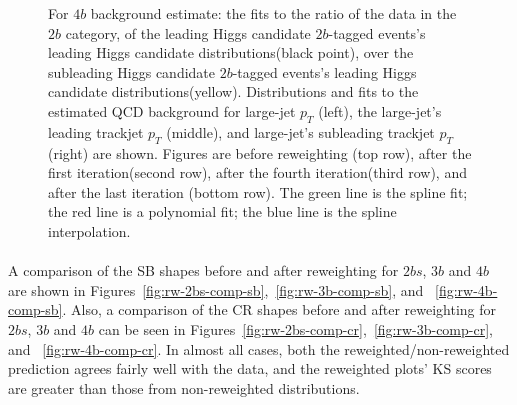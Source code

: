 \begin{figure}[htbp!]
\begin{center}
\caption{For $4b$ background estimate: the fits to the ratio of the data in the $2b$ category, of the leading Higgs candidate $2b$-tagged events's leading Higgs candidate distributions(black point), over the subleading Higgs candidate $2b$-tagged events's leading Higgs candidate distributions(yellow). Distributions and fits to the estimated QCD background for large-\R jet $p_{T}$ (left),  the large-\R jet's leading trackjet $p_T$ (middle), and large-\R jet's subleading trackjet $p_T$ (right) are shown.  Figures are before reweighting (top row), after the first iteration(second row), after the fourth iteration(third row), and after the last iteration (bottom row). The green line is the spline fit; the red line is a polynomial fit; the blue line is the spline interpolation.}
\label{fig:rw-4b-subl}
\end{center}
\end{figure}


\paragraph{}
A comparison of the SB shapes before and after reweighting for $2bs$, $3b$ and $4b$ are shown in Figures~\ref{fig:rw-2bs-comp-sb},~\ref{fig:rw-3b-comp-sb}, and ~\ref{fig:rw-4b-comp-sb}. 
Also, a comparison of the CR shapes before and after reweighting for $2bs$, $3b$ and $4b$ can be seen in Figures~\ref{fig:rw-2bs-comp-cr},~\ref{fig:rw-3b-comp-cr}, and ~\ref{fig:rw-4b-comp-cr}. 
In almost all cases, both the reweighted/non-reweighted prediction agrees fairly well with the data, and the reweighted plots' KS scores are greater than those from non-reweighted distributions. 

